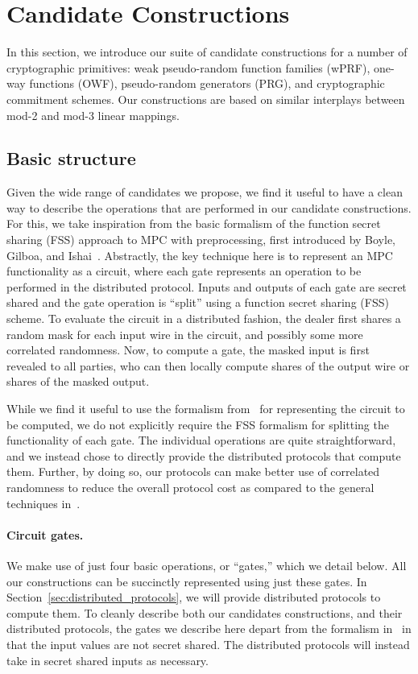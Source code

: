 
\newpage

\section{Candidate Constructions}
In this section, we introduce our suite of candidate constructions for a number of cryptographic primitives: weak pseudo-random function families (wPRF), one-way functions (OWF), pseudo-random generators (PRG), and cryptographic commitment schemes. Our constructions are based on similar interplays between mod-2 and mod-3 linear mappings. 

\subsection{Basic structure}
Given the wide range of candidates we propose, we find it useful to have a clean way to describe the operations that are performed in our candidate constructions. For this, we take inspiration from the basic formalism of the function secret sharing (FSS) approach to MPC with preprocessing, first introduced by Boyle, Gilboa, and Ishai~\cite{boyle2019-fss-preprocess}. Abstractly, the key technique here is to represent an MPC functionality as a circuit, where each gate represents an operation to be performed in the distributed protocol. Inputs and outputs of each gate are secret shared and the gate operation is ``split'' using a function secret sharing (FSS) scheme. To evaluate the circuit in a distributed fashion, the dealer first shares a random mask for each input wire in the circuit, and possibly some more correlated randomness. Now, to compute a gate, the masked input is first revealed to all parties, who can then locally compute shares of the output wire or shares of the masked output.

While we find it useful to use the formalism from~\cite{boyle2019-fss-preprocess} for representing the circuit to be computed, we do not explicitly require the FSS formalism for splitting the functionality of each gate. The individual operations are quite straightforward, and we instead chose to directly provide the distributed protocols that compute them. Further, by doing so, our protocols can make better use of correlated randomness to reduce the overall protocol cost as compared to the general techniques in~\cite{boyle2019-fss-preprocess}.


\paragraph{Circuit gates.}
We make use of just four basic operations, or ``gates,'' which we detail below. All our constructions can be succinctly represented using just these gates. In Section~\ref{sec:distributed_protocols}, we will provide distributed protocols to compute them. To cleanly describe both our candidates constructions, and their distributed protocols, the gates we describe here depart from the formalism in~\cite{boyle2019-fss-preprocess} in that the input values are not secret shared. The distributed protocols will instead take in secret shared inputs as necessary.

